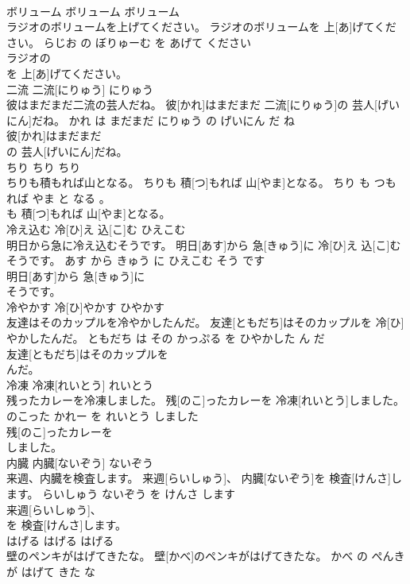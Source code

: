 \documentclass[8pt]{extreport}
\begin{document}
\begin{CJK}{UTF8}{min}
\\	ボリューム	ボリューム	ボリューム	
\\	ラジオのボリュームを上げてください。	ラジオのボリュームを 上[あ]げてください。	らじお の ぼりゅーむ を あげて ください	
\\	ラジオの
\\	を 上[あ]げてください。			
\\	二流	二流[にりゅう]	にりゅう	
\\	彼はまだまだ二流の芸人だね。	彼[かれ]はまだまだ 二流[にりゅう]の 芸人[げいにん]だね。	かれ は まだまだ にりゅう の げいにん だ ね	
\\	彼[かれ]はまだまだ
\\	の 芸人[げいにん]だね。			
\\	ちり	ちり	ちり	
\\	ちりも積もれば山となる。	ちりも 積[つ]もれば 山[やま]となる。	ちり も つもれば やま と なる 。	
\\	も 積[つ]もれば 山[やま]となる。			
\\	冷え込む	冷[ひ]え 込[こ]む	ひえこむ	
\\	明日から急に冷え込むそうです。	明日[あす]から 急[きゅう]に 冷[ひ]え 込[こ]むそうです。	あす から きゅう に ひえこむ そう です	
\\	明日[あす]から 急[きゅう]に
\\	そうです。			
\\	冷やかす	冷[ひ]やかす	ひやかす	
\\	友達はそのカップルを冷やかしたんだ。	友達[ともだち]はそのカップルを 冷[ひ]やかしたんだ。	ともだち は その かっぷる を ひやかした ん だ	
\\	友達[ともだち]はそのカップルを
\\	んだ。			
\\	冷凍	冷凍[れいとう]	れいとう	
\\	残ったカレーを冷凍しました。	残[のこ]ったカレーを 冷凍[れいとう]しました。	のこった かれー を れいとう しました	
\\	残[のこ]ったカレーを
\\	しました。			
\\	内臓	内臓[ないぞう]	ないぞう	
\\	来週、内臓を検査します。	来週[らいしゅう]、 内臓[ないぞう]を 検査[けんさ]します。	らいしゅう ないぞう を けんさ します	
\\	来週[らいしゅう]、
\\	を 検査[けんさ]します。			
\\	はげる	はげる	はげる	
\\	壁のペンキがはげてきたな。	壁[かべ]のペンキがはげてきたな。	かべ の ぺんき が はげて きた な	

\end{CJK}
\end{document}
